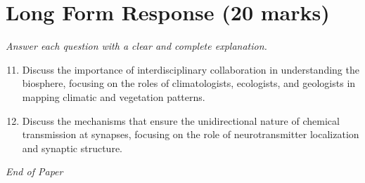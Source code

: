 \documentclass[12pt]{article}
\begin{document}
\section*{Long Form Response (20 marks)}
\textit{Answer each question with a clear and complete explanation.}
\begin{enumerate}[label=\arabic*.]
\setcounter{enumi}{10}
\item Discuss the importance of interdisciplinary collaboration in understanding the biosphere, focusing on the roles of climatologists, ecologists, and geologists in mapping climatic and vegetation patterns.
\item Discuss the mechanisms that ensure the unidirectional nature of chemical transmission at synapses, focusing on the role of neurotransmitter localization and synaptic structure.
\end{enumerate}

\vfill
\noindent\textit{End of Paper}
\end{document}
